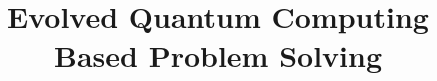 \documentclass[conference]{IEEEtran}
\begin{document}
\title{Evolved Quantum Computing Based Problem Solving\\
}


\maketitle
\end{document}
